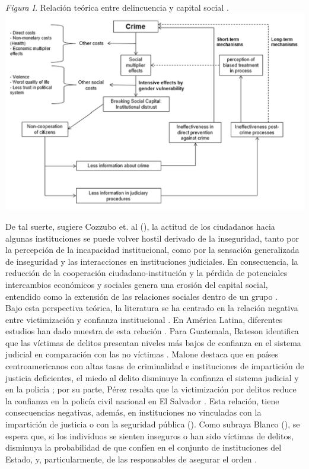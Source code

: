 \documentclass[letterpaper]{article}
\begin{document}
\vspace{-0.2cm}
\begin{center}
\emph{Figura I}. Relación teórica entre delincuencia y capital social \autocite{cozzubo2021}.
\includegraphics[width = 17cm]{plot1.png}
    \label{tab:Figura1}
\end{center}
\vspace{-0.2cm}

De tal suerte, sugiere Cozzubo et. al (\citeyear{cozzubo2021}), la actitud de los ciudadanos hacia algunas instituciones se puede volver hostil derivado de la inseguridad, tanto por la percepción de la incapacidad institucional, como por la sensación generalizada de inseguridad y las interacciones en instituciones judiciales. En consecuencia, la reducción de la cooperación ciudadano-institución y la pérdida de potenciales intercambios económicos y sociales genera una erosión del capital social, entendido como la extensión de las relaciones sociales dentro de un grupo \autocite{corbacho2015, corbacho2012, cozzubo2021, putnam1994, blanco2012, blanco2013b}.\\[-1.5em]

Bajo esta perspectiva teórica, la literatura se ha centrado en la relación negativa entre victimización y confianza institucional \autocite{blanco2012, blanco2013b}. En América Latina, diferentes estudios han dado muestra de esta relación \autocite{corbacho2015, corbacho2012}. Para Guatemala, Bateson identifica que las víctimas de delitos presentan niveles más bajos de confianza en el sistema judicial en comparación con las no víctimas \autocite{bateson2010}. Malone destaca que en países centroamericanos con altas tasas de criminalidad e instituciones de impartición de justicia deficientes, el miedo al delito disminuye la confianza el sistema judicial y en la policía \autocite{malone2010a}; por su parte, Pérez resalta que la victimización por delitos reduce la confianza en la policía civil nacional en El Salvador \autocite{corbacho2012}. Esta relación, tiene consecuencias negativas, además, en instituciones no vinculadas con la impartición de justicia o con la seguridad pública (\citeyear{cozzubo2021}). Como subraya Blanco (\citeyear{blanco2012}), se espera que, si los individuos se sienten inseguros o han sido víctimas de delitos, disminuya la probabilidad de que confíen en el conjunto de instituciones del Estado, y, particularmente, de las responsables de asegurar el orden \autocite{blanco2012, blanco2013b, weyland2003}.
\end{document}
